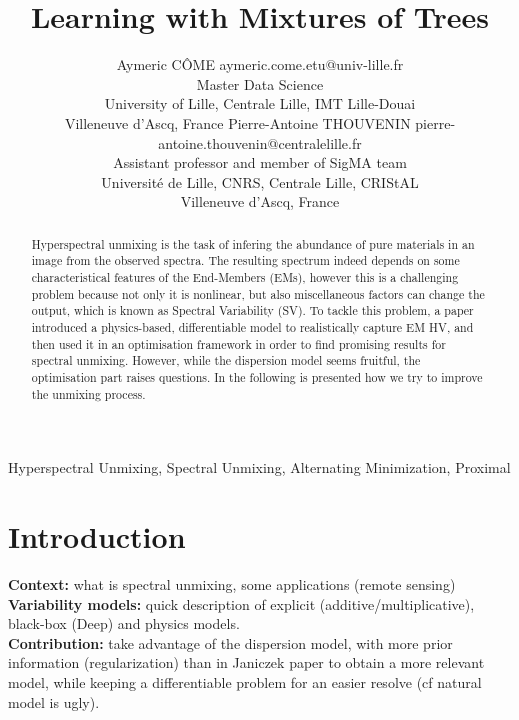 \documentclass{article}
\begin{document}
\title{Learning with Mixtures of Trees}

\author{\name Aymeric CÔME \email aymeric.come.etu@univ-lille.fr \\
       \addr Master Data Science\\
       University of Lille, Centrale Lille, IMT Lille-Douai\\
       Villeneuve d'Ascq, France
       \AND
       \name Pierre-Antoine THOUVENIN \email pierre-antoine.thouvenin@centralelille.fr \\
       \addr Assistant professor and member of SigMA team\\
       Université de Lille, CNRS, Centrale Lille, CRIStAL\\
       Villeneuve d'Ascq, France}

\maketitle

\begin{abstract}%
  Hyperspectral unmixing is the task of infering the abundance of pure materials in an image from the observed spectra. The resulting spectrum indeed depends on some characteristical features of the End-Members (EMs), however this is a challenging problem because not only it is nonlinear, but also miscellaneous factors can change the output, which is known as Spectral Variability (SV). To tackle this problem, a paper \citep{janiczek_differentiable_2020} introduced a physics-based, differentiable model to realistically capture EM HV, and then used it in an optimisation framework in order to find promising results for spectral unmixing. However, while the dispersion model seems fruitful, the optimisation part raises questions. In the following is presented how we try to improve the unmixing process.
\end{abstract}

\begin{keywords}
Hyperspectral Unmixing, Spectral Unmixing, Alternating Minimization, Proximal
\end{keywords}

\section{Introduction}
\textbf{Context:} what is spectral unmixing, some applications (remote sensing)\\
\textbf{Variability models:} quick description of explicit (additive/multiplicative), black-box (Deep) and physics models.\\
\textbf{Contribution:} take advantage of the dispersion model, with more prior information (regularization) than in Janiczek paper to obtain a more relevant model, while keeping a differentiable problem for an easier resolve (cf natural model is ugly).\\
\end{document}
